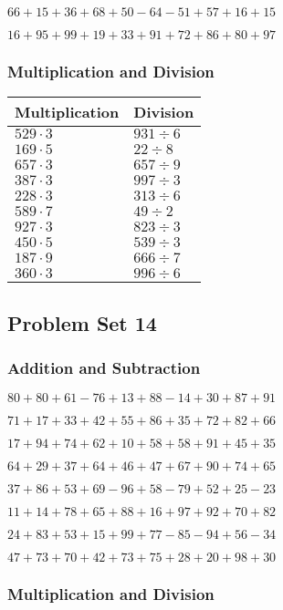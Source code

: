\(66+15+36+68+50-64-51+57+16+15\)

\(16+95+99+19+33+91+72+86+80+97\)

\hypertarget{multiplication-and-division-12}{%
\subsubsection{Multiplication and
Division}\label{multiplication-and-division-12}}

\begin{longtable}[]{@{}ll@{}}
\toprule
Multiplication & Division\tabularnewline
\midrule
\endhead
\(529\cdot3\) & \(931÷6\)\tabularnewline
\(169\cdot5\) & \(22÷8\)\tabularnewline
\(657\cdot3\) & \(657÷9\)\tabularnewline
\(387\cdot3\) & \(997÷3\)\tabularnewline
\(228\cdot3\) & \(313÷6\)\tabularnewline
\(589\cdot7\) & \(49÷2\)\tabularnewline
\(927\cdot3\) & \(823÷3\)\tabularnewline
\(450\cdot5\) & \(539÷3\)\tabularnewline
\(187\cdot9\) & \(666÷7\)\tabularnewline
\(360\cdot3\) & \(996÷6\)\tabularnewline
\bottomrule
\end{longtable}

\hypertarget{problem-set-14}{%
\subsection{Problem Set 14}\label{problem-set-14}}

\hypertarget{addition-and-subtraction-13}{%
\subsubsection{Addition and
Subtraction}\label{addition-and-subtraction-13}}

\(80+80+61-76+13+88-14+30+87+91\)

\(71+17+33+42+55+86+35+72+82+66\)

\(17+94+74+62+10+58+58+91+45+35\)

\(64+29+37+64+46+47+67+90+74+65\)

\(37+86+53+69-96+58-79+52+25-23\)

\(11+14+78+65+88+16+97+92+70+82\)

\(24+83+53+15+99+77-85-94+56-34\)

\(47+73+70+42+73+75+28+20+98+30\)

\hypertarget{multiplication-and-division-13}{%
\subsubsection{Multiplication and
Division}\label{multiplication-and-division-13}}

